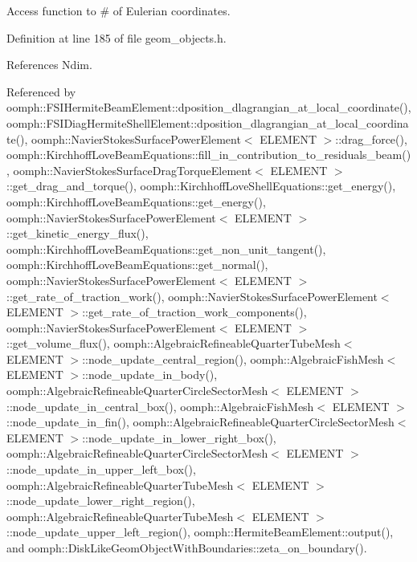 Access function to \# of Eulerian coordinates. 



Definition at line 185 of file geom\+\_\+objects.\+h.



References Ndim.



Referenced by oomph\+::\+F\+S\+I\+Hermite\+Beam\+Element\+::dposition\+\_\+dlagrangian\+\_\+at\+\_\+local\+\_\+coordinate(), oomph\+::\+F\+S\+I\+Diag\+Hermite\+Shell\+Element\+::dposition\+\_\+dlagrangian\+\_\+at\+\_\+local\+\_\+coordinate(), oomph\+::\+Navier\+Stokes\+Surface\+Power\+Element$<$ E\+L\+E\+M\+E\+N\+T $>$\+::drag\+\_\+force(), oomph\+::\+Kirchhoff\+Love\+Beam\+Equations\+::fill\+\_\+in\+\_\+contribution\+\_\+to\+\_\+residuals\+\_\+beam(), oomph\+::\+Navier\+Stokes\+Surface\+Drag\+Torque\+Element$<$ E\+L\+E\+M\+E\+N\+T $>$\+::get\+\_\+drag\+\_\+and\+\_\+torque(), oomph\+::\+Kirchhoff\+Love\+Shell\+Equations\+::get\+\_\+energy(), oomph\+::\+Kirchhoff\+Love\+Beam\+Equations\+::get\+\_\+energy(), oomph\+::\+Navier\+Stokes\+Surface\+Power\+Element$<$ E\+L\+E\+M\+E\+N\+T $>$\+::get\+\_\+kinetic\+\_\+energy\+\_\+flux(), oomph\+::\+Kirchhoff\+Love\+Beam\+Equations\+::get\+\_\+non\+\_\+unit\+\_\+tangent(), oomph\+::\+Kirchhoff\+Love\+Beam\+Equations\+::get\+\_\+normal(), oomph\+::\+Navier\+Stokes\+Surface\+Power\+Element$<$ E\+L\+E\+M\+E\+N\+T $>$\+::get\+\_\+rate\+\_\+of\+\_\+traction\+\_\+work(), oomph\+::\+Navier\+Stokes\+Surface\+Power\+Element$<$ E\+L\+E\+M\+E\+N\+T $>$\+::get\+\_\+rate\+\_\+of\+\_\+traction\+\_\+work\+\_\+components(), oomph\+::\+Navier\+Stokes\+Surface\+Power\+Element$<$ E\+L\+E\+M\+E\+N\+T $>$\+::get\+\_\+volume\+\_\+flux(), oomph\+::\+Algebraic\+Refineable\+Quarter\+Tube\+Mesh$<$ E\+L\+E\+M\+E\+N\+T $>$\+::node\+\_\+update\+\_\+central\+\_\+region(), oomph\+::\+Algebraic\+Fish\+Mesh$<$ E\+L\+E\+M\+E\+N\+T $>$\+::node\+\_\+update\+\_\+in\+\_\+body(), oomph\+::\+Algebraic\+Refineable\+Quarter\+Circle\+Sector\+Mesh$<$ E\+L\+E\+M\+E\+N\+T $>$\+::node\+\_\+update\+\_\+in\+\_\+central\+\_\+box(), oomph\+::\+Algebraic\+Fish\+Mesh$<$ E\+L\+E\+M\+E\+N\+T $>$\+::node\+\_\+update\+\_\+in\+\_\+fin(), oomph\+::\+Algebraic\+Refineable\+Quarter\+Circle\+Sector\+Mesh$<$ E\+L\+E\+M\+E\+N\+T $>$\+::node\+\_\+update\+\_\+in\+\_\+lower\+\_\+right\+\_\+box(), oomph\+::\+Algebraic\+Refineable\+Quarter\+Circle\+Sector\+Mesh$<$ E\+L\+E\+M\+E\+N\+T $>$\+::node\+\_\+update\+\_\+in\+\_\+upper\+\_\+left\+\_\+box(), oomph\+::\+Algebraic\+Refineable\+Quarter\+Tube\+Mesh$<$ E\+L\+E\+M\+E\+N\+T $>$\+::node\+\_\+update\+\_\+lower\+\_\+right\+\_\+region(), oomph\+::\+Algebraic\+Refineable\+Quarter\+Tube\+Mesh$<$ E\+L\+E\+M\+E\+N\+T $>$\+::node\+\_\+update\+\_\+upper\+\_\+left\+\_\+region(), oomph\+::\+Hermite\+Beam\+Element\+::output(), and oomph\+::\+Disk\+Like\+Geom\+Object\+With\+Boundaries\+::zeta\+\_\+on\+\_\+boundary().

